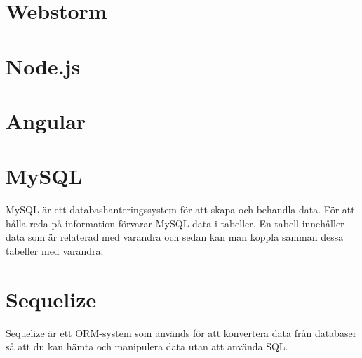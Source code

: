 \section{Webstorm}

\section{Node.js}

\section{Angular}

\section{MySQL}
MySQL är ett databashanteringssystem för att skapa och behandla data. För att hålla reda på information förvarar MySQL data i tabeller. En tabell innehåller data som är relaterad med varandra och sedan kan man koppla samman dessa tabeller med varandra.
\cite{mysql}

\section{Sequelize}
Sequelize är ett ORM-system som används för att konvertera data från databaser så att du kan hämta och manipulera data utan att använda SQL.
\cite{sequelize}